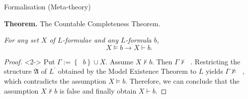 \documentclass[serif,table,10pt]{beamer}
\newcommand{\0}{\texttt{0}}
\newcommand{\1}{\texttt{1}}
\newcommand{\embed}[1]{{\upharpoonleft} {#1}}
\newcommand{\Leq}{\mathrel{\dot{=}}}
\newcommand{\Lbot}{\mathop{\dot{\bot}}}
\newcommand{\Lneg}{\mathop{\dot{\neg}}}
\begin{document}

\begin{frame}{Formalisation (Meta-theory)}

    \textbf{Theorem.}
    The Countable Completeness Theorem.

    \emph{For any set $X$ of $L$-formulae and any $L$-formula $b$, \[ X \vDash b \to X \vdash b . \]}

    \begin{proof}<2->
        Put $\Gamma := \left\{ \Lneg b \right\} \cup X$. Assume $X \nvdash b$. Then $\Gamma \nvdash \Lbot$. Restricting the structure $ \mathfrak{A}$ of $L^\prime$ obtained by the Model Existence Theorem to $L$ yields $\Gamma \nvDash \Lbot$, which contradicts the assumption $X \vDash b$. Therefore, we can conclude that the assumption $X \nvdash b$ is false and finally obtain $X \vdash b$.
    \end{proof}

\end{frame}
\end{document}
